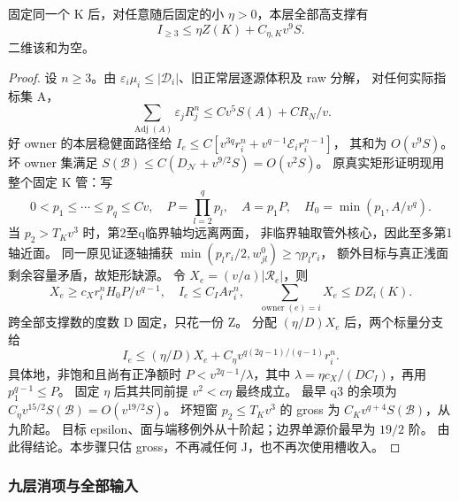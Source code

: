 \begin{lemma}\label{quant:high-gross}
固定同一个 K 后，对任意随后固定的小 \(\eta>0\)，本层全部高支撑有
\[
 I_{\ge3}\le\eta Z(K)+C_{\eta,K}v^9S.
\]
二维该和为空。
\end{lemma}
\begin{proof}
设 \(n\ge3\)。由
\(\varepsilon_i\mu_i\le|\mathscr D_i|\)、旧正常层逐源体积及 raw 分解，
对任何实际指标集 A，
\[
 \sum_{\operatorname{Adj}(A)}\varepsilon_jR_j^n
 \le Cv^5S(A)+CR_N/v.
\]
好 owner 的本层稳健面路径给
\(I_e\le C[v^{3q}r_i^n+v^{q-1}\mathcal E_ir_i^{n-1}]\)，
其和为 \(O(v^9S)\)。
坏 owner 集满足 \(S(\mathcal B)\le C(D_{\mathcal N}+v^{9/2}S)=O(v^2S)\)。
原真实矩形证明现用整个固定 K 管：写
\[
 0<p_1\le\cdots\le p_q\le Cv,\quad
 P=\prod_{l=2}^qp_l,\quad A=p_1P,\quad H_0=\min(p_1,A/v^q).
\]
当 \(p_2>T_Kv^3\) 时，第2至q临界轴均远离两面，
非临界轴取管外核心，因此至多第1轴近面。
同一原见证逐轴捕获
\(\min(p_lr_i/2,w^0_{jl})\ge\gamma p_lr_i\)，
额外目标与真正浅面剩余容量矛盾，故矩形缺源。
令 \(X_e=(v/a)|\mathcal R_e|\)，则
\[
 X_e\ge c_Xr_i^nH_0P/v^{q-1},\quad I_e\le C_IAr_i^n,\quad
 \sum_{\operatorname{owner}(e)=i}X_e\le D Z_i(K).
\]
跨全部支撑数的度数 D 固定，只花一份 Z。
分配 \((\eta/D)X_e\) 后，两个标量分支给
\[
 I_e\le(\eta/D)X_e+C_\eta
                 v^{q(2q-1)/(q-1)}r_i^n.
\]
具体地，非饱和且尚有正净额时
\(P<v^{2q-1}/\lambda\)，其中
\(\lambda=\eta c_X/(DC_I)\)，再用 \(p_1^{q-1}\le P\)。
固定 \(\eta\) 后其共同前提 \(v^2<c\eta\) 最终成立。
最早 q3 的余项为 \(C_\eta v^{15/2}S(\mathcal B)=O(v^{19/2}S)\)。
坏短窗 \(p_2\le T_Kv^3\) 的 gross 为
\(C_Kv^{q+4}S(\mathcal B)\)，从九阶起。
目标 epsilon、面与端移例外从十阶起；边界单源价最早为 \(19/2\) 阶。
由此得结论。本步骤只估 gross，不再减任何 J，也不再次使用槽收入。
\end{proof}

\subsubsection{九层消项与全部输入}

